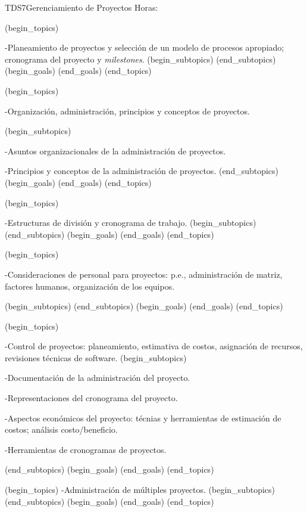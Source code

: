 \begin{BKL2}{TDS7}{Gerenciamiento de Proyectos}
Horas:
 
(begin_topics)

-Planeamiento de proyectos y selección de un modelo de procesos apropiado; cronograma del proyecto y {\it milestones}.
(begin_subtopics)
(end_subtopics)
(begin_goals)
(end_goals)
(end_topics)

 

(begin_topics)

-Organización, administración, principios y conceptos de proyectos.

(begin_subtopics)

-Asuntos organizacionales de la administración de proyectos.

-Principios y conceptos de la administración de proyectos.
(end_subtopics)
(begin_goals)
(end_goals)
(end_topics)

 

(begin_topics)

-Estructuras de división y cronograma de trabajo.
(begin_subtopics)
(end_subtopics)
(begin_goals)
(end_goals)
(end_topics)

 

(begin_topics)

-Consideraciones de personal para proyectos: p.e., administración de matriz, factores humanos, organización de los equipos.

(begin_subtopics)
(end_subtopics)
(begin_goals)
(end_goals)
(end_topics)

 

(begin_topics)

-Control de proyectos: planeamiento, estimativa de costos, asignación de recursos, revisiones técnicas de software.
(begin_subtopics)

-Documentación de la administración del proyecto.

-Representaciones del cronograma del proyecto.

-Aspectos económicos del proyecto: técnias y herramientas de estimación de costos; análisis costo/beneficio.

-Herramientas de cronogramas de proyectos.

(end_subtopics)
(begin_goals)
(end_goals)
(end_topics)

 

(begin_topics)
-Administración de múltiples proyectos.
(begin_subtopics)
(end_subtopics)
(begin_goals)
(end_goals)
(end_topics)

 


\end{BKL2}
